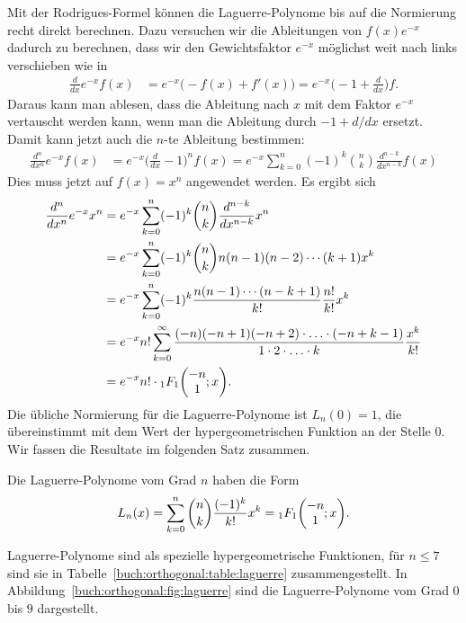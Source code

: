 Mit der Rodrigues-Formel können die Laguerre-Polynome bis auf
die Normierung recht direkt berechnen.
Dazu versuchen wir die Ableitungen von $f(x)e^{-x}$ dadurch zu
berechnen, dass wir den Gewichtsfaktor $e^{-x}$ möglichst weit
nach links verschieben wie in
\begin{align*}
\frac{d}{dx}
e^{-x}
f(x)
&=
e^{-x}
\bigl( -f(x) + f'(x) \bigr)
=
e^{-x}
\biggl( -1 + \frac{d}{dx}\biggr) f.
\end{align*}
Daraus kann man ablesen, dass die Ableitung nach $x$ mit dem Faktor
$e^{-x}$ vertauscht werden kann, wenn man die Ableitung durch
$-1+d/dx$ ersetzt.
Damit kann jetzt auch die $n$-te Ableitung bestimmen:
\begin{align*}
\frac{d^n}{dx^n}e^{-x}f(x)
&=
e^{-x} \biggl(\frac{d}{dx}-1\biggr)^n f(x)
=
e^{-x} \sum_{k=0}^n (-1)^{k}\binom{n}{k}\frac{d^{n-k}}{dx^{n-k}} f(x)
\end{align*}
Dies muss jetzt auf $f(x)=x^n$ angewendet werden.
Es ergibt sich
\begin{align*}
\frac{d^n}{dx^n}e^{-x}x^n
&=
e^{-x} \sum_{k=0}^n (-1)^{k}\binom{n}{k}\frac{d^{n-k}}{dx^{n-k}} x^n
\\
&=
e^{-x} \sum_{k=0}^n (-1)^{k}\binom{n}{k}
n(n-1)(n-2)\cdots (k+1)
x^k
\\
&=
e^{-x}
\sum_{k=0}^n (-1)^k \frac{n(n-1)\cdots(n-k+1)}{k!}
\frac{n!}{k!}
x^k
\\
&=
e^{-x} n!
\sum_{k=0}^\infty
\frac{(-n)(-n+1)(-n+2)\cdot\ldots\cdot (-n+k-1)}{1\cdot 2\cdot \ldots\cdot k}
\frac{x^k}{k!}
\\
&=
e^{-x} n!
\cdot
\mathstrut_1F_1\biggl(
\begin{matrix}-n\\1\end{matrix}; x
\biggr).
\end{align*}
Die übliche Normierung für die Laguerre-Polynome ist $L_n(0)=1$,
die übereinstimmt mit dem Wert der hypergeometrischen Funktion 
an der Stelle $0$.
Wir fassen die Resultate im folgenden Satz zusammen.

\begin{satz}
Die Laguerre-Polynome vom Grad $n$ haben die Form
\begin{equation}
L_n(x)
=
\sum_{k=0}^n \binom{n}{k}\frac{(-1)^k}{k!}x^k
=
\mathstrut_1F_1\biggl(\begin{matrix}-n\\1\end{matrix};x\biggr).
\label{buch:orthogonal:eqn:laguerre-polynom-hypergeometrisch}
\end{equation}
\end{satz}
Laguerre-Polynome sind als spezielle hypergeometrische Funktionen,
für $n\le 7$ sind sie 
in Tabelle~\ref{buch:orthogonal:table:laguerre} zusammengestellt.
In Abbildung~\ref{buch:orthogonal:fig:laguerre} sind die Laguerre-Polynome
vom Grad $0$ bis $9$ dargestellt.


